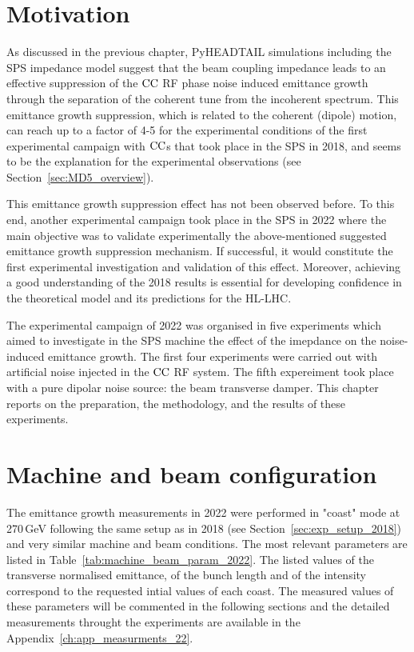 \section{Motivation}\label{sec:motivation_md_2022}
As discussed in the previous chapter, PyHEADTAIL simulations including the SPS impedance model suggest that the beam coupling impedance leads to an effective suppression of the ${\mathrm{CC}}$ RF phase noise induced emittance growth through the separation of the coherent tune from the incoherent spectrum. This emittance growth suppression, which is related to the coherent (dipole) motion, can reach up to a factor of 4-5 for the experimental conditions of the first experimental campaign with ${\mathrm{CC}}$s that took place in the SPS in 2018, and seems to be the explanation for the experimental observations (see Section~\ref{sec:MD5_overview}).

This emittance growth suppression effect has not been observed before. To this end, another experimental campaign took place in the SPS in 2022 where the main objective was to validate experimentally the above-mentioned suggested emittance growth suppression mechanism. If successful, it would constitute the first experimental investigation and validation of this effect. Moreover, achieving a good understanding of the 2018 results is essential for developing confidence in the theoretical model and its predictions for the HL-LHC.

The experimental campaign of 2022 was organised in five experiments which aimed to investigate in the SPS machine the effect of the imepdance on the noise-induced emittance growth. The first four experiments were carried out with artificial noise injected in the ${\mathrm{CC}}$ RF system. The fifth expereiment took place with a pure dipolar noise source: the beam transverse damper. This chapter reports on the preparation, the methodology, and the results of these experiments.



\section{Machine and beam configuration}\label{sec:cc_md_2022_parameters}
The emittance growth measurements in 2022 were performed in "coast" mode at 270\,GeV following the same setup as in 2018 (see Section~\ref{sec:exp_setup_2018}) and very similar machine and beam conditions. The most relevant parameters are listed in Table~\ref{tab:machine_beam_param_2022}. The listed values of the transverse normalised emittance, of the bunch length and of the intensity correspond to the requested intial values of each coast. The measured values of these parameters will be commented in the following sections and the detailed measurements throught the experiments are available in the Appendix~\ref{ch:app_measurments_22}. 


